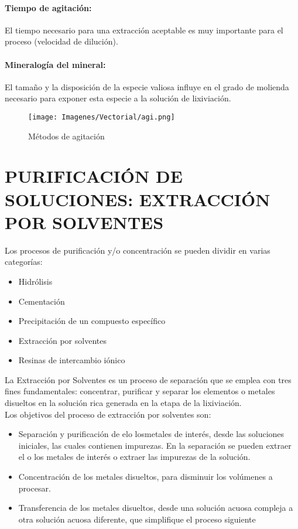 \paragraph{Tiempo de agitaci\'on:} 
El tiempo necesario para una extracci\'on aceptable es muy importante para el proceso (velocidad de diluci\'on).
\paragraph{Mineralog\'ia del mineral:}
El tama\~no y la disposici\'on de la especie valiosa influye en el grado de molienda necesario para exponer esta especie a la soluci\'on de lixiviaci\'on.

\begin{figure}[H]
 \centering
 \texttt{[image: Imagenes/Vectorial/agi.png]}
 \caption{M\'etodos de agitaci\'on}
 \label{fig:agi}
\end{figure}

\section{PURIFICACI\'ON DE SOLUCIONES: EXTRACCI\'ON POR SOLVENTES}
Los  procesos  de  purificaci\'on  y/o  concentraci\'on  se  pueden  dividir  en  varias categor\'ias:
\begin{itemize}
 \item Hidr\'olisis
 \item Cementaci\'on
 \item Precipitaci\'on de un compuesto espec\'ifico
 \item Extracci\'on por solventes
 \item Resinas de intercambio i\'onico
\end{itemize}

La Extracci\'on por Solventes es un proceso de separaci\'on que se emplea con tres fines fundamentales: concentrar, purificar y separar los elementos o metales disueltos en la soluci\'on rica generada en la etapa de la lixiviaci\'on.\\ 

Los objetivos del proceso de extracci\'on por solventes son:
\begin{itemize}
 \item Separaci\'on y purificaci\'on de \textacutedbl el\textgravedbl o \textacutedbl los\textgravedbl metales de inter\'es, desde las soluciones iniciales,  las  cuales contienen impurezas. En la separaci\'on se pueden extraer el o los metales de inter\'es o extraer las impurezas de la soluci\'on.
 \item Concentraci\'on de los metales disueltos, para disminuir los vol\'umenes a procesar.
 \item Transferencia de los metales disueltos, desde una soluci\'on acuosa compleja a otra soluci\'on acuosa diferente, que simplifique el proceso siguiente 
\end{itemize}

